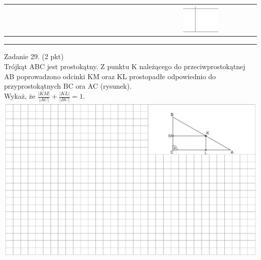 \documentclass[10pt]{article}
\begin{document}
\begin{center}
\begin{tabular}{|c|c|c|c|c|c|c|c|c|c|c|c|c|c|c|c|c|c|c|c|c|c|c|c|c|c|c|c|c|c|c|}
 &  &  &  &  &  &  &  &  &  &  &  &  &  &  &  &  &  &  &  &  &  &  &  &  & \includegraphics[max width=\textwidth]{2024_11_21_55bf50695fa934dbe20eg-09}
 &  &  &  &  &  \\
\hline
 &  &  &  &  &  &  &  &  &  &  &  &  &  &  &  &  &  &  &  &  &  &  &  &  &  &  &  &  &  &  \\
\hline
 &  &  &  &  &  &  &  &  &  &  &  &  &  &  &  &  &  &  &  &  &  &  &  &  &  &  &  &  &  &  \\
\hline
 &  &  &  &  &  &  &  &  &  &  &  &  &  &  &  &  &  &  &  &  &  &  &  &  &  &  &  &  &  &  \\
\hline
\end{tabular}
\end{center}

Zadanie 29. (2 pkt)\\
Trójkąt ABC jest prostokątny. Z punktu K należącego do przeciwprostokątnej AB poprowadzono odcinki KM oraz KL prostopadłe odpowiednio do przyprostokątnych BC ora AC (rysunek).\\
Wykaż, że \(\frac{|K M|}{|A C|}+\frac{|K L|}{|B C|}=1\).\\
\includegraphics[max width=\textwidth, center]{2024_11_21_55bf50695fa934dbe20eg-09(1)}
\end{document}
